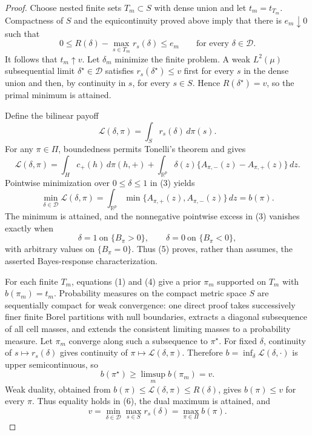 \documentclass{article}
\begin{document}
\begin{proof}
Choose nested finite sets \(T_m\subset S\) with dense union and let \(t_m=t_{T_m}\). Compactness of \(S\) and the equicontinuity proved above imply that there is \(e_m\downarrow0\) such that
\[
 0\leq R(\delta)-\max_{s\in T_m}r_s(\delta)\leq e_m
 \qquad\text{for every }\delta\in\mathcal D. \tag{2}
\]
It follows that \(t_m\uparrow v\). Let \(\delta_m\) minimize the finite problem. A weak \(L^2(\mu)\) subsequential limit \(\delta^{\star}\in\mathcal D\) satisfies \(r_s(\delta^{\star})\leq v\) first for every \(s\) in the dense union and then, by continuity in \(s\), for every \(s\in S\). Hence \(R(\delta^{\star})=v\), so the primal minimum is attained.

Define the bilinear payoff
\[
 \mathcal L(\delta,\pi)=\int_S r_s(\delta)\,d\pi(s).
\]
For any \(\pi\in\Pi\), boundedness permits Tonelli's theorem and gives
\[
 \mathcal L(\delta,\pi)
 =\int_Hc_{+}(h)\,d\pi(h,+)
   +\int_{\mathbb R^p}\delta(z)\{A_{\pi,-}(z)-A_{\pi,+}(z)\}\,dz. \tag{3}
\]
Pointwise minimization over \(0\leq\delta\leq1\) in (3) yields
\[
 \min_{\delta\in\mathcal D}\mathcal L(\delta,\pi)
 =\int_{\mathbb R^p}\min\{A_{\pi,+}(z),A_{\pi,-}(z)\}\,dz=b(\pi). \tag{4}
\]
The minimum is attained, and the nonnegative pointwise excess in (3) vanishes exactly when
\[
 \delta=1\ \text{on }\{B_{\pi}>0\},\qquad
 \delta=0\ \text{on }\{B_{\pi}<0\}, \tag{5}
\]
with arbitrary values on \(\{B_{\pi}=0\}\). Thus (5) proves, rather than assumes, the asserted Bayes-response characterization.

For each finite \(T_m\), equations (1) and (4) give a prior \(\pi_m\) supported on \(T_m\) with \(b(\pi_m)=t_m\). Probability measures on the compact metric space \(S\) are sequentially compact for weak convergence: one direct proof takes successively finer finite Borel partitions with null boundaries, extracts a diagonal subsequence of all cell masses, and extends the consistent limiting masses to a probability measure. Let \(\pi_m\) converge along such a subsequence to \(\pi^{\star}\). For fixed \(\delta\), continuity of \(s\mapsto r_s(\delta)\) gives continuity of \(\pi\mapsto\mathcal L(\delta,\pi)\). Therefore \(b=\inf_{\delta}\mathcal L(\delta,\cdot)\) is upper semicontinuous, so
\[
 b(\pi^{\star})\geq\limsup_m b(\pi_m)=v. \tag{6}
\]
Weak duality, obtained from \(b(\pi)\leq\mathcal L(\delta,\pi)\leq R(\delta)\), gives \(b(\pi)\leq v\) for every \(\pi\). Thus equality holds in (6), the dual maximum is attained, and
\[
 v=\min_{\delta\in\mathcal D}\max_{s\in S}r_s(\delta)
  =\max_{\pi\in\Pi}b(\pi). \tag{7}
\]


\end{proof}
\end{document}
